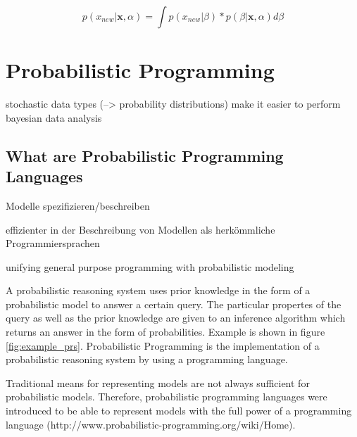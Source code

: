 \documentclass{article}
\begin{document}
\begin{equation}
p(x_{new}|\boldsymbol x, \alpha) = \int p(x_{new}|\beta) * p(\beta | \boldsymbol x,\alpha) d \beta
\label{eq:posterior_predictive}
\end{equation}

\section{Probabilistic Programming}

stochastic data types (--> probability distributions) make it easier to perform bayesian data analysis

\subsection{What are Probabilistic Programming Languages}

Modelle spezifizieren/beschreiben 

\cite{wiki:Probabilisticprogramminglanguage}

effizienter in der Beschreibung von Modellen als herkömmliche Programmiersprachen \cite{Hardesty2015}

unifying general purpose programming with probabilistic modeling \cite{probabilistic-programming.org}


A \gls{probabilistic reasoning system} uses prior knowledge in the form of a \gls{probabilistic model} to answer a certain query. The particular propertes of the query as well as the prior knowledge are given to an \gls{inference algorithm} which returns an answer in the form of probabilities. Example is shown in figure \ref{fig:example_prs}. Probabilistic Programming is the implementation of a \gls{probabilistic reasoning system} by using a programming language.

Traditional means for representing models are not always sufficient for probabilistic models. Therefore, probabilistic programming languages were introduced to be able to represent models with the full power of a programming language (http://www.probabilistic-programming.org/wiki/Home).
\end{document}
